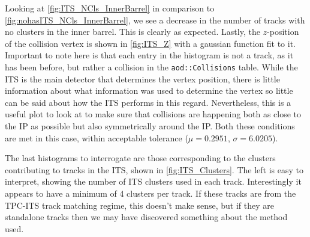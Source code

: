 Looking at \cref{fig:ITS_NCls_InnerBarrel} in comparison to \cref{fig:nohasITS_NCls_InnerBarrel}, we see a decrease in the number of tracks with no clusters in the inner barrel. This is clearly as expected. Lastly, the $z$-position of the collision vertex is shown in \cref{fig:ITS_Z} with a gaussian function fit to it. Important to note here is that each entry in the histogram is not a track, as it has been before, but rather a collision in the \texttt{aod::Collisions} table. While the ITS is the main detector that determines the vertex position, there is little information about what information was used to determine the vertex so little can be said about how the ITS performs in this regard. Nevertheless, this is a useful plot to look at to make sure that collisions are happening both as close to the IP as possible but also symmetrically around the IP. Both these conditions are met in this case, within acceptable tolerance ($\mu=0.2951$, $\sigma=6.0205$). 

\bigskip

The last histograms to interrogate are those corresponding to the clusters contributing to tracks in the ITS, shown in \cref{fig:ITS_Clusters}. The left is easy to interpret, showing the number of ITS clusters used in each track. Interestingly it appears to have a minimum of 4 clusters per track. If these tracks are from the TPC-ITS track matching regime, this doesn't make sense, but if they are standalone tracks then we may have discovered something about the method used.

